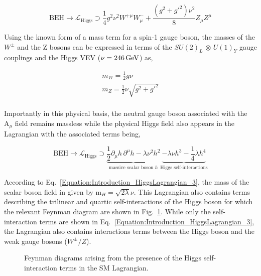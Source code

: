 \begin{equation}
    \text{BEH} \rightarrow \mathcal{L}_{\text{Higgs}} \supset \frac{1}{4} g^2 \nu^2 W^{+\mu}W_{\mu}^- + \frac{(g^2+g'^2)\nu^2}{8} Z_\mu Z^\mu
\label{Equation:Introduction_HiggsLagrangian_2}
\end{equation}

Using the known form of a mass term for a spin-1 gauge boson, the masses of the $W^\pm$ and the Z bosons can be expressed in terms of the $SU(2)_{L}$ $\otimes$ $U(1)_{Y}$ gauge couplings and the Higgs VEV ($\nu = 246 \,\text{Ge\hspace{-.08em}V}$) as,

\begin{equation}
\begin{array}{c}
    m_W = \frac{1}{2}g\nu \\
    m_Z = \frac{1}{2}\nu\sqrt{g^2+g'^2}\\
\end{array}
\end{equation}

Importantly in this physical basis, the neutral gauge boson associated with the $\text{A}_\mu$ field remains massless while the physical Higgs field also appears in the Lagrangian with the associated terms being,

\begin{equation}
    \text{BEH} \rightarrow \mathcal{L}_{\text{Higgs}} \supset \underbrace{\frac{1}{2} \partial_\mu h \, \partial^\mu h - \lambda \nu^2 h^2}_{\text{massive scalar boson } h}
    \underbrace{- \lambda \nu h^3 - \frac{1}{4} \lambda h^4}_{\text{Higgs self-interactions}}
\label{Equation:Introduction_HiggsLagrangian_3}
\end{equation}

According to Eq.~\ref{Equation:Introduction_HiggsLagrangian_3}, the mass of the scalar boson field in given by $\text{m}_H = \sqrt{2\lambda}\nu$. This Lagrangian also contains terms describing the trilinear and quartic self-interactions of the Higgs boson for which the relevant Feynman diagram are shown in Fig.~\ref{Figure:Introduction_HiggsSelf}. While only the self-interaction terms are shown in Eq.~\ref{Equation:Introduction_HiggsLagrangian_3}, the Lagrangian also contains interactions terms between the Higgs boson and the weak gauge bosons ($W^\pm/Z$). 

\begin{figure}[h]
    \centering
    \begin{subfigure}{0.45\textwidth}
        \centering
        
    \end{subfigure}
    \hfill
    \begin{subfigure}{0.45\textwidth}
        \centering
        
    \end{subfigure}
    \caption{Feynman diagrams arising from the presence of the Higgs self-interaction terms in the SM Lagrangian.}
    \label{Figure:Introduction_HiggsSelf}
\end{figure}

